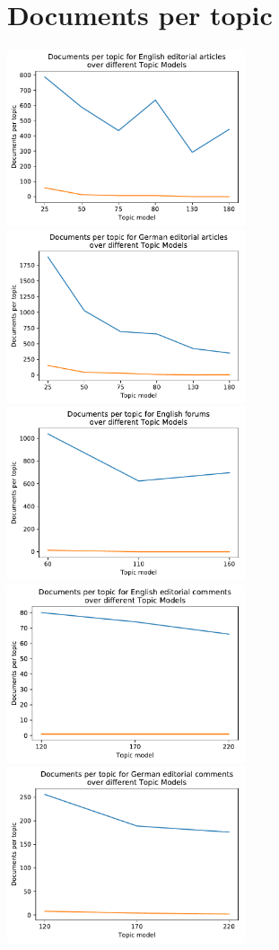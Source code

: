 \section{Documents per topic}

\includegraphics[width=7cm]{gfx/Eval_IC/English_Editorial_Doc_per_topic.pdf}
\includegraphics[width=7cm]{gfx/Eval_IC/German_Editorial_Doc_per_topic.pdf}
\includegraphics[width=7cm]{gfx/Eval_IC/English forums_Doc_per_topic.pdf}
\includegraphics[width=7cm]{gfx/Eval_IC/Eng_comments_Doc_per_topic.pdf}
\includegraphics[width=7cm]{gfx/Eval_IC/German_comments_Doc_per_topic.pdf}

